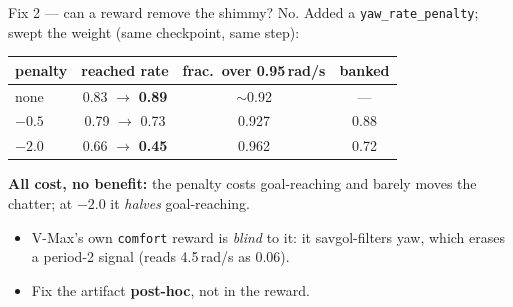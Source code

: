 \begin{frame}{Fix 2 --- can a reward remove the shimmy? No.}
  Added a \texttt{yaw\_rate\_penalty}; swept the weight (same checkpoint, same step):
  \begin{center}
    \small
    \begin{tabular}{@{}lccc@{}}
      \toprule
      penalty & reached rate & frac.\ over 0.95\,rad/s & banked \\
      \midrule
      none    & 0.83 $\to$ \textbf{0.89} & $\sim$0.92 & --- \\
      $-0.5$  & 0.79 $\to$ 0.73          & 0.927      & 0.88 \\
      $-2.0$  & 0.66 $\to$ \textbf{0.45} & 0.962      & 0.72 \\
      \bottomrule
    \end{tabular}
  \end{center}

  \vspace{0.4em}
  \textbf{All cost, no benefit:} the penalty costs goal-reaching and barely moves the chatter;
  at $-2.0$ it \emph{halves} goal-reaching.
  \begin{itemize}
    \item V-Max's own \texttt{comfort} reward is \emph{blind} to it: it savgol-filters yaw,
          which erases a period-2 signal (reads 4.5\,rad/s as 0.06).
    \item[$\Rightarrow$] Fix the artifact \textbf{post-hoc}, not in the reward.
  \end{itemize}
\end{frame}

